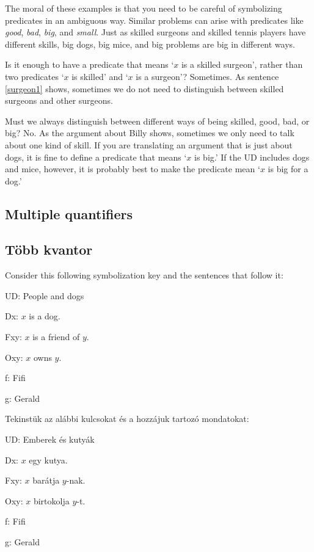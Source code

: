 The moral of these examples is that you need to be careful of symbolizing predicates in an ambiguous way. Similar problems can arise with predicates like \emph{good}, \emph{bad}, \emph{big}, and \emph{small}. Just as skilled surgeons and skilled tennis players have different skills, big dogs, big mice, and big problems are big in different ways.

Is it enough to have a predicate that means `$x$ is a skilled surgeon', rather than two predicates `$x$ is skilled' and `$x$ is a surgeon'? Sometimes. As sentence \ref{surgeon1} shows, sometimes we do not need to distinguish between skilled surgeons and other surgeons.

Must we always distinguish between different ways of being skilled, good, bad, or big? No. As the argument about Billy shows, sometimes we only need to talk about one kind of skill. If you are translating an argument that is just about dogs, it is fine to define a predicate that means `$x$ is big.' If the UD includes dogs and mice, however, it is probably best to make the predicate mean `$x$ is big for a dog.'



\subsection*{Multiple quantifiers}
\subsection{Több kvantor}
Consider this following symbolization key and the sentences that follow it:
\begin{ekey}
\item{UD:} People and dogs
\item{Dx:} $x$ is a dog.
\item{Fxy:} $x$ is a friend of $y$.
\item{Oxy:} $x$ owns $y$.
\item{f:} Fifi
\item{g:} Gerald
\end{ekey}

Tekinstük az alábbi kulcsokat és a hozzájuk tartozó mondatokat:
\begin{ekey}
\item{UD:} Emberek és kutyák
\item{Dx:} $x$ egy kutya.
\item{Fxy:} $x$ barátja $y$-nak.
\item{Oxy:} $x$ birtokolja $y$-t.
\item{f:} Fifi
\item{g:} Gerald
\end{ekey}

